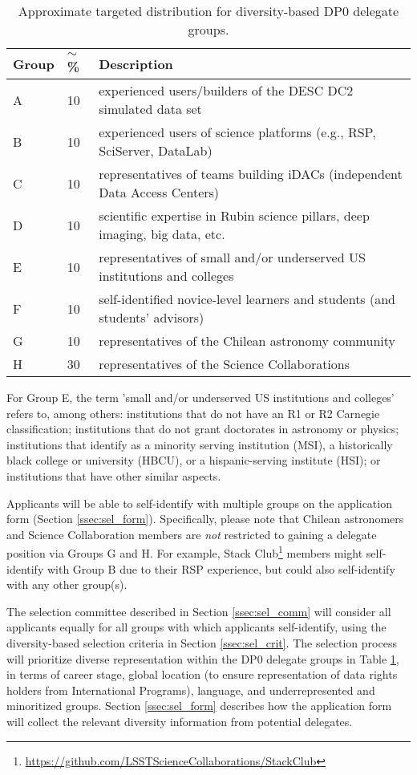 \documentclass[DM,lsstdraft,authoryear,toc]{lsstdoc}
\begin{document}
\begin{table}[!h]
\centering
\caption{Approximate targeted distribution for diversity-based DP0 delegate groups.}\label{tab:delegate_groups}
\begin{tabular}{lll}
\hline
Group & $\sim$\% & Description \\
\hline \hline
A & 10 & experienced users/builders of the DESC DC2 simulated data set \\
B & 10 & experienced users of science platforms (e.g., RSP, SciServer, DataLab) \\
C & 10 & representatives of teams building iDACs (independent Data Access Centers) \\
D & 10 & scientific expertise in Rubin science pillars, deep imaging, big data, etc. \\
E & 10 & representatives of small and/or underserved US institutions and colleges \\
F & 10 & self-identified novice-level learners and students (and students' advisors) \\
G & 10 & representatives of the Chilean astronomy community \\
H & 30 & representatives of the Science Collaborations \\
\hline
\end{tabular}
\end{table}

For Group E, the term 'small and/or underserved US institutions and colleges' refers to, among others: institutions that do not have an R1 or R2 Carnegie classification; institutions that do not grant doctorates in astronomy or physics; institutions that identify as a minority serving institution (MSI), a historically black college or university (HBCU), or a hispanic-serving institute (HSI); or institutions that have other similar aspects.

Applicants will be able to self-identify with multiple groups on the application form (Section \ref{ssec:sel_form}).
Specifically, please note that Chilean astronomers and Science Collaboration members are {\it not} restricted to gaining a delegate position via Groups G and H. 
For example, Stack Club\footnote{\url{https://github.com/LSSTScienceCollaborations/StackClub}} members might self-identify with Group B due to their RSP experience, but could also self-identify with any other group(s).

The selection committee described in Section \ref{ssec:sel_comm} will consider all applicants equally for all groups with which applicants self-identify, using the diversity-based selection criteria in Section \ref{ssec:sel_crit}.
The selection process will prioritize diverse representation within the DP0 delegate groups in Table \ref{tab:delegate_groups}, in terms of career stage, global location (to ensure representation of data rights holders from International Programs), language, and underrepresented and minoritized groups.
Section \ref{ssec:sel_form} describes how the application form will collect the relevant diversity information from potential delegates.
\end{document}
